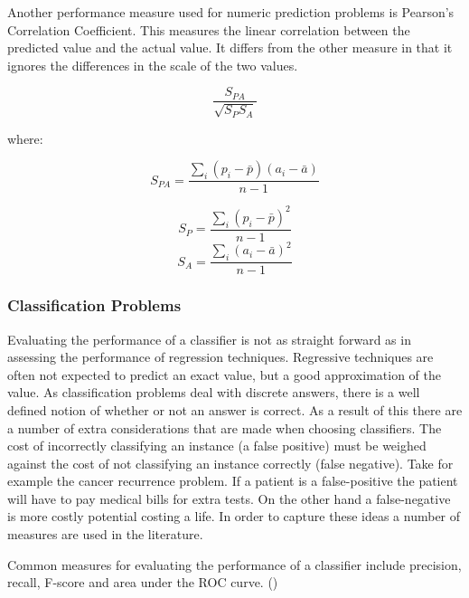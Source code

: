 Another performance measure used for numeric prediction problems is Pearson's Correlation Coefficient. This measures the linear correlation between the predicted value and the actual value. It differs from the other measure in that it ignores the differences in the scale of the two values.

$$\frac{S_{PA}}{\sqrt{S_{P}S_{A}}}$$

where:

$$S_{PA} = \frac{\sum _{i}(p_i - \bar{p})(a_i - \bar{a})}{n - 1}$$

$$S_{P} = \frac{\sum _{i}(p_i - \bar{p})^2}{n - 1}$$
$$S_{A} = \frac{\sum _{i}(a_i - \bar{a})^2}{n - 1}$$

\subsubsection{Classification Problems}

Evaluating the performance of a classifier is not as straight forward as in assessing the performance of regression techniques. Regressive techniques are often not expected to predict an exact value, but a good approximation of the value. As classification problems deal with discrete answers, there is a well defined notion of whether or not an answer is correct. As a result of this there are a number of extra considerations that are made when choosing classifiers. The cost of incorrectly classifying an instance (a false positive) must be weighed against the cost of not classifying an instance correctly (false negative). Take for example the cancer recurrence problem. If a patient is a false-positive the patient will have to pay medical bills for extra tests. On the other hand a false-negative is more costly potential costing a life. In order to capture these ideas a number of measures are used in the literature.

Common measures for evaluating the performance of a classifier include precision, recall, F-score and area under the ROC curve. (\cite{powers2011evaluation}) 


